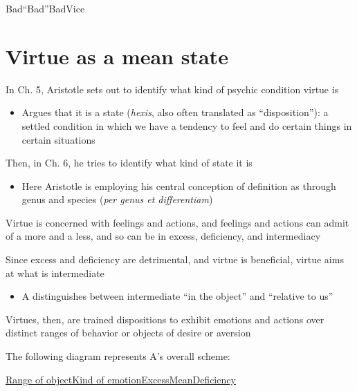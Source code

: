 \documentclass[11pt]{article}
\begin{document}
\noindent Bad\hspace*{23mm}``Bad''\hspace*{35mm}Bad\hspace*{29mm}Vice

\section*{Virtue as a mean state}

\noindent In Ch. 5, Aristotle sets out to identify what kind of psychic condition virtue is

\begin{itemize}\item{Argues that it is a state (\emph{hexis}, also often translated as ``disposition''): a settled condition in which we have a tendency to feel and do certain things in certain situations}\end{itemize}

\noindent Then, in Ch. 6, he tries to identify what kind of state it is

\begin{itemize}\item{Here Aristotle is employing his central conception of definition as through genus and species (\emph{per genus et differentiam})}\end{itemize}

\noindent Virtue is concerned with feelings and actions, and feelings and actions can admit of a more and a less, and so can be in excess, deficiency, and intermediacy
\vspace*{2mm}

\noindent Since excess and deficiency are detrimental, and virtue is beneficial, virtue aims at what is intermediate
\begin{itemize}\item{A distinguishes between intermediate ``in the object'' and ``relative to us''}\end{itemize}

\noindent Virtues, then, are trained dispositions to exhibit emotions and actions over distinct ranges of behavior or objects of desire or aversion
\vspace*{2mm}

\noindent The following diagram represents A's overall scheme:
\vspace*{2mm}

\noindent\underline{Range of object\hspace*{10mm}Kind of emotion\hspace*{10mm}Excess\hspace*{17mm}Mean\hspace*{18mm}Deficiency}
\vspace*{1mm}
\end{document}
